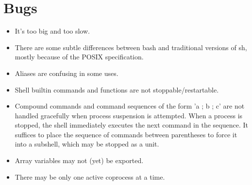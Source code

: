 \section{Bugs}\label{sec:bugs}
    \begin{itemize}
        \item  It's too big and too slow.
        
        \item  There are some subtle differences between bash and traditional versions of sh, mostly because of the POSIX specification.
    
        \item  Aliases are confusing in some uses.
    
        \item  Shell builtin commands and functions are not stoppable/restartable.
    
        \item  Compound commands and command sequences of the form 'a ; b ; c' are not handled gracefully when process suspension is attempted. When a process is stopped, the shell immediately executes the next command in the sequence. It suffices to place the sequence of commands between parentheses to force it into a subshell, which may be stopped as a unit.
    
        \item  Array variables may not (yet) be exported.
    
        \item  There may be only one active coprocess at a time.
    \end{itemize}
